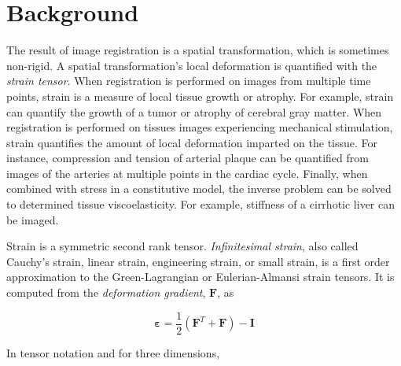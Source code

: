 \documentclass{InsightArticle}
\newcommand{\IJhandlerIDnumber}{1338}
\begin{document}
\IJhandlenote{\IJhandlerIDnumber}

\tableofcontents

\section{Background}

The result of image registration is a spatial transformation, which is sometimes
non-rigid. A spatial transformation's local deformation is quantified with
the \textit{strain tensor}. When registration is performed on images from multiple
time points, strain is a measure of local tissue growth or atrophy. For
example, strain can quantify the growth of a tumor or atrophy of cerebral gray
matter. When registration is performed on tissues images experiencing
mechanical stimulation, strain quantifies the amount of local
deformation imparted on the tissue. For instance, compression and tension of
arterial plaque can be quantified from images of the arteries at multiple
points in the cardiac cycle. Finally, when combined with stress in a
constitutive model, the inverse problem can be solved to determined tissue
viscoelasticity. For example, stiffness of a cirrhotic liver can be imaged.

Strain is a symmetric second rank tensor. \textit{Infinitesimal strain}, also
called Cauchy's strain, linear strain, engineering strain, or small strain, is a
first order approximation to the Green-Lagrangian or Eulerian-Almansi strain
tensors. It is computed from the \textit{deformation gradient},
$\mathbf{F}$, as\cite{WikipediaStrainTheory}

\begin{equation}
  \mathbf{\varepsilon}=\frac{1}{2}\left(\mathbf{F}^T+\mathbf{F}\right)-\mathbf{I}
\end{equation}

In tensor notation and for three dimensions,
\end{document}
